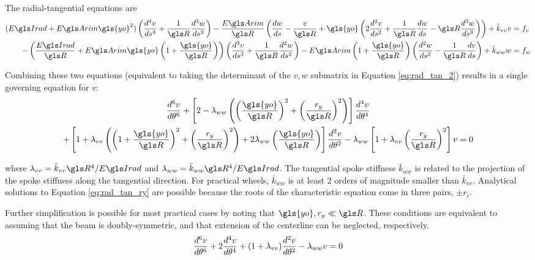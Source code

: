 \documentclass[\rootdir/thesis.tex]{subfiles}
\begin{document}
The radial-tangential equations are
\begin{subequations}
\begin{align}
\label{eq:rad_tan_2}
(\EIr + \EA \gls{yo}^2)\left( \ds{v}{4} + \frac{1}{\R}\ds{w}{3} \right) -
    \frac{\EA}{\R}\left( \frac{dw}{ds} - \frac{v}{\R} +\gls{yo}\left(2\ds{v}{2} + \frac{1}{\R}\frac{dw}{ds} -
    \R\ds{w}{3}\right) \right) +\bar{k}_{vv}v &= f_v\\
-\left( \frac{\EIr}{\R} + \EA \gls{yo}\left( 1 + \frac{\gls{yo}}{\R} \right) \right)
    \left(\ds{v}{3} + \frac{1}{\R}\ds{w}{2} \right) -
    \EA\left(1+\frac{\gls{yo}}{\R} \right) \left(\ds{w}{2} - \frac{1}{\R}\frac{dv}{ds} \right) + \bar{k}_{ww}w &= f_w
\end{align}
\end{subequations}

Combining these two equations (equivalent to taking the determinant of the $v,w$ submatrix in Equation \eqref{eq:rad_tan_2}) results in a single governing equation for $v$:
\begin{multline}
\label{eq:rad_tan_ry}
\dt{v}{6} + \left[2-\lr_{ww}\left(\left(\frac{\gls{yo}}{\R}\right)^2 +
                                        \left(\frac{\ry}{\R}\right)^2 \right) \right] \dt{v}{4}\\
          + \left[1+\lr_{vv}\left(\left(1+\frac{\gls{yo}}{\R}\right)^2+\left(\frac{\ry}{\R}\right)^2\right)
                   +2\lr_{ww}\left(\frac{\gls{yo}}{\R}\right)\right]\dt{v}{2}
          - \lr_{ww}\left[1+\lr_{vv}\left(\frac{\ry}{\R}\right)^2\right] v = 0
\end{multline}

where $\lr_{vv}=\bar{k}_{vv}\R^4/\EIr$ and $\lr_{ww}=\bar{k}_{ww}\R^4/\EIr$. The tangential spoke stiffness $\bar{k}_{ww}$ is related to the projection of the spoke stiffness along the tangential direction. For practical wheels, $\bar{k}_{ww}$ is at least 2 orders of magnitude smaller than $\bar{k}_{vv}$. Analytical solutions to Equation \eqref{eq:rad_tan_ry} are possible because the roots of the characteristic equation come in three pairs, $\pm r_i$.

Further simplification is possible for most practical cases by noting that $\gls{yo},\ry \ll \R$. These conditions are equivalent to assuming that the beam is doubly-symmetric, and that extension of the centerline can be neglected, respectively.
\begin{equation}
\label{eq:rad_tan}
\frac{d^6v}{d\theta^6} + 2\frac{d^4v}{d\theta^4}+(1+\lambda_{vv})\frac{d^2v}{d\theta^2} - \lambda_{ww}v=0
\end{equation}
\end{document}
